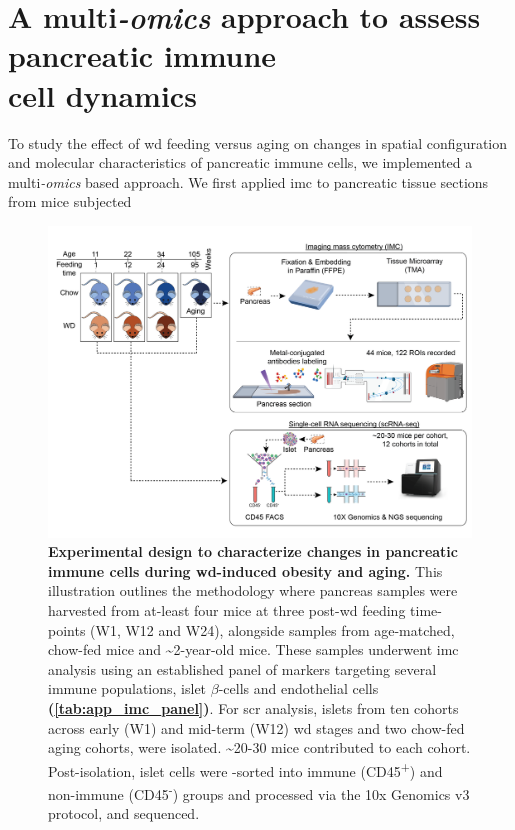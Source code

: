 \clearpage

\section[A multi\textit{-omics} approach to assess pancreatic immune cell dynamics]{A multi\textit{-omics} approach to assess pancreatic immune\\cell dynamics}
\label{sec:chp2_workflow}

To study the effect of \gls{wd} feeding versus aging on changes in spatial configuration and molecular characteristics of pancreatic immune cells, we implemented a multi\textit{-omics} based approach. We first applied \gls{imc} to pancreatic tissue sections from mice subjected 

\begin{figure}[b!]
\centering
\includegraphics[width=15cm]{Chapter4/Fig/F2-1-01.png}
\caption[Experimental design to study -induced obesity and aging]{\textbf{Experimental design to characterize changes in pancreatic immune cells during \gls{wd}-induced obesity and aging.} This illustration outlines the methodology where pancreas samples were harvested from at-least four mice at three post-\gls{wd} feeding time-points (W1, W12 and W24), alongside samples from age-matched, chow-fed mice and \textasciitilde2-year-old mice. These samples underwent \gls{imc} analysis using an established panel of markers targeting several immune populations, islet $\beta$-cells and endothelial cells \textbf{(\autoref{tab:app_imc_panel})}. For \gls{scr} analysis, islets from ten cohorts across early (W1) and mid-term (W12) \gls{wd} stages and two chow-fed aging cohorts, were isolated. \textasciitilde20-30 mice contributed to each cohort. Post-isolation, islet cells were -sorted into immune (CD45\textsuperscript{+}) and non-immune (CD45\textsuperscript{-}) groups and processed via the 10x Genomics v3 protocol, and sequenced.}
\label{fig:chp2_experimental_design}
\end{figure}


